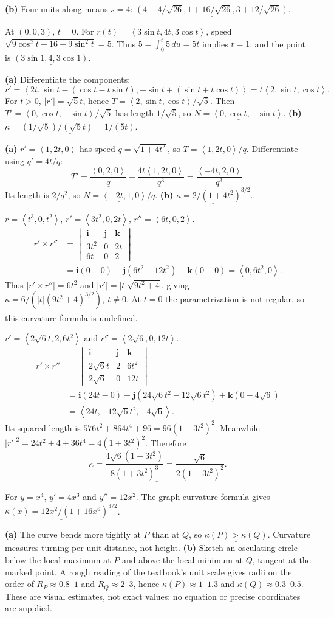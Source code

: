 \documentclass[10pt]{article}
\newcommand{\ex}[1]{\par\addvspace{6pt}\noindent\llap{\makebox[.62in][r]{\large\bfseries #1.\hspace{.12in}}}\ignorespaces}
\newcommand{\ans}[1]{\underline{#1}}
\newcommand{\vv}[1]{\left\langle #1\right\rangle}
\newcommand{\ii}{\mathbf i}\newcommand{\jj}{\mathbf j}\newcommand{\kk}{\mathbf k}
\newcommand{\cp}[6]{\begin{vmatrix}\ii&\jj&\kk\\#1&#2&#3\\#4&#5&#6\end{vmatrix}}
\begin{document}
\textbf{(b)} Four units along means $s=4$: $\ans{(4-4/\sqrt{26},1+16/\sqrt{26},3+12/\sqrt{26})}$.
\ex{17}
At $(0,0,3)$, $t=0$. For $r(t)=\vv{3\sin t,4t,3\cos t}$, speed $\sqrt{9\cos^2t+16+9\sin^2t}=5$. Thus $5=\int_0^t5\,du=5t$ implies $t=1$, and the point is $\ans{(3\sin1,4,3\cos1)}$.
\ex{19}
\textbf{(a)} Differentiate the components:
\[r'=\vv{2t,\sin t-(\cos t-t\sin t),-\sin t+(\sin t+t\cos t)}=t\vv{2,\sin t,\cos t}.\]
For $t>0$, $|r'|=\sqrt5t$, hence $T=\vv{2,\sin t,\cos t}/\sqrt5$. Then $T'=\vv{0,\cos t,-\sin t}/\sqrt5$ has length $1/\sqrt5$, so $\ans{N=\vv{0,\cos t,-\sin t}}$.
\textbf{(b)} $\ans{\kappa=(1/\sqrt5)/(\sqrt5t)=1/(5t)}$.
\ex{21}
\textbf{(a)} $r'=\vv{1,2t,0}$ has speed $q=\sqrt{1+4t^2}$, so $T=\vv{1,2t,0}/q$. Differentiate using $q'=4t/q$:
\[T'=\frac{\vv{0,2,0}}q-\frac{4t\vv{1,2t,0}}{q^3}=\frac{\vv{-4t,2,0}}{q^3}.\]
Its length is $2/q^2$, so $\ans{N=\vv{-2t,1,0}/q}$.
\textbf{(b)} $\ans{\kappa=2/(1+4t^2)^{3/2}}$.
\ex{25}
$r=\vv{t^3,0,t^2}$, $r'=\vv{3t^2,0,2t}$, $r''=\vv{6t,0,2}$.
\begin{align*}r'\times r''&=\cp{3t^2}{0}{2t}{6t}{0}{2}\\&=\ii(0-0)-\jj(6t^2-12t^2)+\kk(0-0)=\vv{0,6t^2,0}.\end{align*}
Thus $|r'\times r''|=6t^2$ and $|r'|=|t|\sqrt{9t^2+4}$, giving $\ans{\kappa=6/(|t|(9t^2+4)^{3/2}),\ t\ne0}$. At $t=0$ the parametrization is not regular, so this curvature formula is undefined.
\ex{27}
$r'=\vv{2\sqrt6t,2,6t^2}$ and $r''=\vv{2\sqrt6,0,12t}$.
\begin{align*}r'\times r''&=\cp{2\sqrt6t}{2}{6t^2}{2\sqrt6}{0}{12t}\\&=\ii(24t-0)-\jj(24\sqrt6t^2-12\sqrt6t^2)+\kk(0-4\sqrt6)\\&=\vv{24t,-12\sqrt6t^2,-4\sqrt6}.\end{align*}
Its squared length is $576t^2+864t^4+96=96(1+3t^2)^2$. Meanwhile $|r'|^2=24t^2+4+36t^4=4(1+3t^2)^2$. Therefore
\[\ans{\kappa=\frac{4\sqrt6(1+3t^2)}{8(1+3t^2)^3}=\frac{\sqrt6}{2(1+3t^2)^2}}.\]
\ex{31}
For $y=x^4$, $y'=4x^3$ and $y''=12x^2$. The graph curvature formula gives $\ans{\kappa(x)=12x^2/(1+16x^6)^{3/2}}$.
\ex{37}
\textbf{(a)} The curve bends more tightly at $P$ than at $Q$, so $\ans{\kappa(P)>\kappa(Q)}$. Curvature measures turning per unit distance, not height.
\textbf{(b)} Sketch an osculating circle below the local maximum at $P$ and above the local minimum at $Q$, tangent at the marked point. A rough reading of the textbook's unit scale gives radii on the order of $R_P\approx0.8$--$1$ and $R_Q\approx2$--$3$, hence $\kappa(P)\approx1$--$1.3$ and $\kappa(Q)\approx0.3$--$0.5$. These are visual estimates, not exact values: no equation or precise coordinates are supplied.
\end{document}
